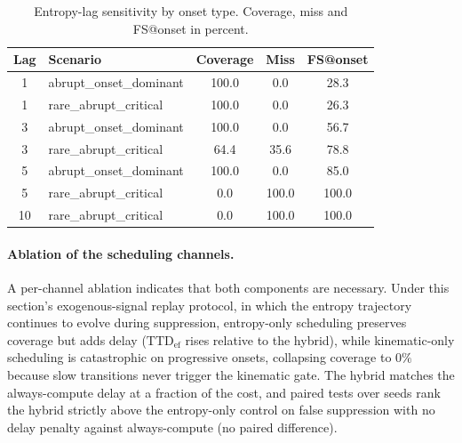 \begin{table}[!tbp]
\centering
\caption{Entropy-lag sensitivity by onset type. Coverage, miss and FS@onset
in percent.}
\label{tab:rob_lag}
\scriptsize
\setlength{\tabcolsep}{4pt}
\renewcommand{\arraystretch}{1.18}
\begin{tabular}{c l c c c}
\toprule
\textbf{Lag} & \textbf{Scenario} & \textbf{Coverage} & \textbf{Miss} & \textbf{FS@onset} \\
\midrule
1  & abrupt\_onset\_dominant & 100.0 & 0.0   & 28.3 \\
\rowcolor{gray!8}
1  & rare\_abrupt\_critical  & 100.0 & 0.0   & 26.3 \\
3  & abrupt\_onset\_dominant & 100.0 & 0.0   & 56.7 \\
\rowcolor{gray!8}
3  & rare\_abrupt\_critical  & 64.4  & 35.6  & 78.8 \\
5  & abrupt\_onset\_dominant & 100.0 & 0.0   & 85.0 \\
\rowcolor{gray!8}
5  & rare\_abrupt\_critical  & 0.0   & 100.0 & 100.0 \\
10 & rare\_abrupt\_critical  & 0.0   & 100.0 & 100.0 \\
\bottomrule
\end{tabular}
\end{table}

\paragraph{Ablation of the scheduling channels.}
A per-channel ablation indicates that both components are necessary.
{\color{\revcolor}Under this section's exogenous-signal replay protocol, in
which the entropy trajectory continues to evolve during suppression,}
entropy-only scheduling preserves coverage but adds delay
($\mathrm{TTD}_{\mathrm{ef}}$ rises relative to the hybrid), while
kinematic-only scheduling is catastrophic on progressive onsets, collapsing
coverage to $0\%$ because slow transitions never trigger the kinematic gate.
The hybrid matches the always-compute delay at a fraction of the cost, and
paired tests over seeds rank the hybrid strictly above the entropy-only
control on false suppression with no delay
penalty against always-compute (no paired difference).
